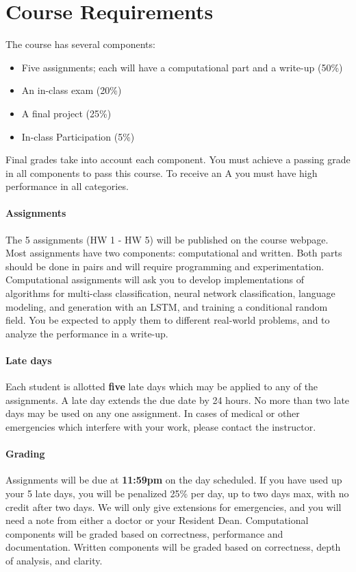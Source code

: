 \documentclass[11pt]{article}
\begin{document}
\vspace {0.25cm}
\section{Course Requirements}

The course has several components:

\begin{itemize}
\item Five assignments; each will have a computational part and a write-up (50\%)
\item An in-class exam (20\%)
\item A final project  (25\%)
\item In-class Participation (5\%)
\end{itemize}


\noindent Final grades take into account each component. You must
achieve a passing grade in all components to pass this course. To
receive an A you must have high performance in all categories.

\paragraph{Assignments}

The 5 assignments (HW 1 - HW 5) will be published on the course
webpage. Most assignments have two components: computational and
written. Both parts should be done in pairs
and will require programming and experimentation. Computational assignments will ask you to develop
implementations of algorithms for multi-class classification, neural
network classification, language modeling, and generation with an
LSTM, and training a conditional random field. You be expected to
apply them to different real-world problems, and to analyze the
performance in a write-up.

\paragraph{Late days} Each student is allotted \textbf{five} late days
which may be applied to any of the assignments.  A late day extends the
due date by 24 hours. No more than two late days may be used on any
one assignment. In cases of medical or other emergencies which
interfere with your work, please contact the
instructor.

\paragraph{Grading} Assignments will be due at \textbf{11:59pm} on the day
scheduled. If you have used up your 5 late days, you will be penalized
25\% per day, up to two days max, with no credit after two days. We
will only give extensions for emergencies, and you will need a note
from either a doctor or your Resident Dean. Computational components
will be graded based on correctness, performance and documentation.
Written components will be graded based on correctness, depth of
analysis, and clarity.
\end{document}
